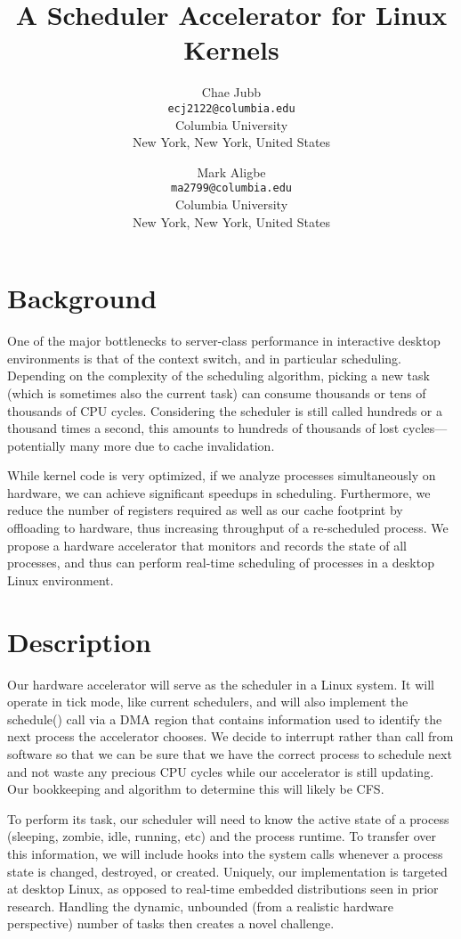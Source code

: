 \documentclass[twocolumn]{article}
\title{A Scheduler Accelerator for Linux Kernels}
\author{
	Chae Jubb \\
	\texttt{ecj2122@columbia.edu} \\
	Columbia University \\
	New York, New York, United States
	\and
	Mark Aligbe \\
	\texttt{ma2799@columbia.edu} \\
	Columbia University \\
	New York, New York, United States 
}
\date{}
\begin{document}
\maketitle

\section*{Background}
One of the major bottlenecks to server-class performance in interactive desktop environments is that of the context switch, and in particular scheduling.
Depending on the complexity of the scheduling algorithm, picking a new task (which is sometimes also the current task) can consume thousands or tens of thousands of CPU cycles.
Considering the scheduler is still called hundreds or a thousand times a second, this amounts to hundreds of thousands of lost cycles---potentially many more due to cache invalidation.

While kernel code is very optimized, if we analyze processes simultaneously on hardware, we can achieve significant speedups in scheduling.
Furthermore, we reduce the number of registers required as well as our cache footprint by offloading to hardware, thus increasing throughput of a re-scheduled process.
We propose a hardware accelerator that monitors and records the state of all processes, and thus can perform real-time scheduling of processes in a desktop Linux environment. 


\section*{Description}
Our hardware accelerator will serve as the scheduler in a Linux system.
It will operate in tick mode, like current schedulers, and will also implement the schedule() call via a DMA region that contains information used to identify the next process the accelerator chooses.
We decide to interrupt rather than call from software so that we can be sure that we have the correct process to schedule next and not waste any precious CPU cycles while our accelerator is still updating.
Our bookkeeping and algorithm to determine this will likely be CFS.

To perform its task, our scheduler will need to know the active state of a process (sleeping, zombie, idle, running, etc) and the process runtime.
To transfer over this information, we will include hooks into the system calls whenever a process state is changed, destroyed, or created.
Uniquely, our implementation is targeted at desktop Linux, as opposed to real-time embedded distributions seen in prior research.
Handling the dynamic, unbounded (from a realistic hardware perspective) number of tasks then creates a novel challenge.
\end{document}
